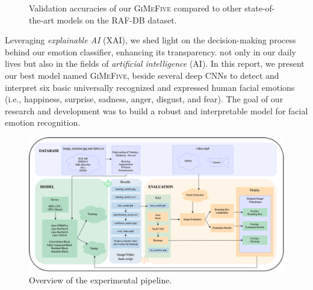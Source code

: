 \begin{figure}[ht]
  \centering
  \caption{Validation accuracies of our \textsc{GiMeFive} compared to other state-of-the-art models on the RAF-DB dataset.} 
  \label{fig:acc}
\end{figure}

Leveraging \textit{explainable AI} (XAI), 
we shed light on the decision-making process behind our emotion classifier, 
enhancing its transparency. 
not only in our daily lives but also in the fields of \textit{artificial intelligence} (AI).
In this report, we present our best model named \textsc{GiMeFive}, 
beside several deep CNNs to detect and interpret six basic universally recognized and expressed human facial emotions 
(i.e., happiness, surprise, sadness, anger, disgust, and fear). 
The goal of our research and development was to build a robust and interpretable model for facial emotion recognition. 

\begin{figure}[ht]
  \centering
   \includegraphics[width=\linewidth]{pipeline.png}
   \caption{Overview of the experimental pipeline.} 
   \label{fig:pipeline}
\end{figure}

